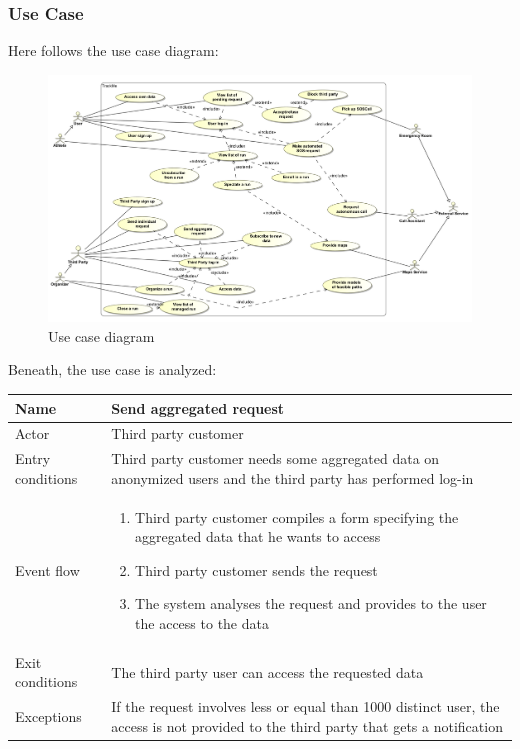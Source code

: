 \subsubsection{Use Case}
Here follows the use case diagram: \\

\begin{figure}[H]
\includegraphics[width=\linewidth]{Images/usecase}
\caption{Use case diagram}
\label{fig:usecasediagram}
\end{figure}

\par 
Beneath, the use case is analyzed:	\\

\begin{table}[H]
\begin{tabularx}{\textwidth}{|l|X|}
\hline
 Name & Send aggregated request \\ \hline
 Actor & Third party customer  \\ \hline
 Entry conditions & Third party customer needs some aggregated data on anonymized users and the third party has performed log-in \\ \hline
 Event flow & 
 \begin{enumerate}
 	\item Third party customer compiles a form specifying the aggregated data that he wants to access
 	\item Third party customer sends the request
 	\item The system analyses the request and provides to the user the access to the data 
 \end{enumerate}   \\ \hline
 Exit conditions & The third party user can access the requested data \\ \hline
 Exceptions & If the request involves less or equal than 1000 distinct user, the access is not provided to the third party that gets a notification \\ \hline
\end{tabularx}
\end{table}


